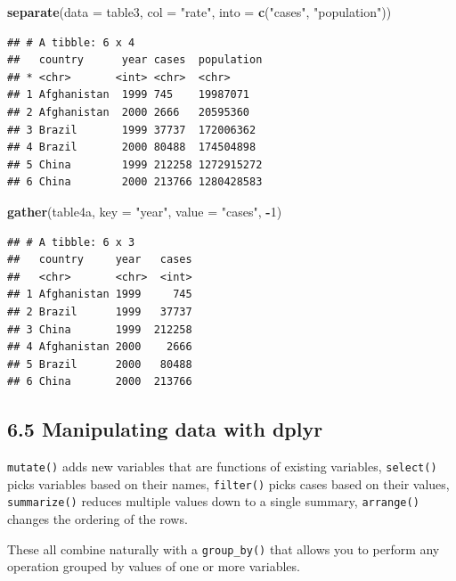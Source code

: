 \documentclass[]{article}
\newenvironment{Shaded}{\begin{snugshade}}{\end{snugshade}}
\newcommand{\KeywordTok}[1]{\textcolor[rgb]{0.13,0.29,0.53}{\textbf{#1}}}
\newcommand{\DataTypeTok}[1]{\textcolor[rgb]{0.13,0.29,0.53}{#1}}
\newcommand{\DecValTok}[1]{\textcolor[rgb]{0.00,0.00,0.81}{#1}}
\newcommand{\StringTok}[1]{\textcolor[rgb]{0.31,0.60,0.02}{#1}}
\newcommand{\OperatorTok}[1]{\textcolor[rgb]{0.81,0.36,0.00}{\textbf{#1}}}
\newcommand{\NormalTok}[1]{#1}
\begin{document}
\begin{Shaded}
\begin{Highlighting}[]
\KeywordTok{separate}\NormalTok{(}\DataTypeTok{data =}\NormalTok{ table3, }\DataTypeTok{col =} \StringTok{"rate"}\NormalTok{, }\DataTypeTok{into =} \KeywordTok{c}\NormalTok{(}\StringTok{"cases"}\NormalTok{, }\StringTok{"population"}\NormalTok{))}
\end{Highlighting}
\end{Shaded}

\begin{verbatim}
## # A tibble: 6 x 4
##   country      year cases  population
## * <chr>       <int> <chr>  <chr>     
## 1 Afghanistan  1999 745    19987071  
## 2 Afghanistan  2000 2666   20595360  
## 3 Brazil       1999 37737  172006362 
## 4 Brazil       2000 80488  174504898 
## 5 China        1999 212258 1272915272
## 6 China        2000 213766 1280428583
\end{verbatim}

\begin{Shaded}
\begin{Highlighting}[]
\KeywordTok{gather}\NormalTok{(table4a, }\DataTypeTok{key =} \StringTok{"year"}\NormalTok{, }\DataTypeTok{value =} \StringTok{"cases"}\NormalTok{, }\OperatorTok{-}\DecValTok{1}\NormalTok{)}
\end{Highlighting}
\end{Shaded}

\begin{verbatim}
## # A tibble: 6 x 3
##   country     year   cases
##   <chr>       <chr>  <int>
## 1 Afghanistan 1999     745
## 2 Brazil      1999   37737
## 3 China       1999  212258
## 4 Afghanistan 2000    2666
## 5 Brazil      2000   80488
## 6 China       2000  213766
\end{verbatim}

\subsection{6.5 Manipulating data with
dplyr}\label{manipulating-data-with-dplyr}

\texttt{mutate()} adds new variables that are functions of existing
variables, \texttt{select()} picks variables based on their names,
\texttt{filter()} picks cases based on their values,
\texttt{summarize()} reduces multiple values down to a single summary,
\texttt{arrange()} changes the ordering of the rows.

These all combine naturally with a \texttt{group\_by()} that allows you
to perform any operation grouped by values of one or more variables.
\end{document}
